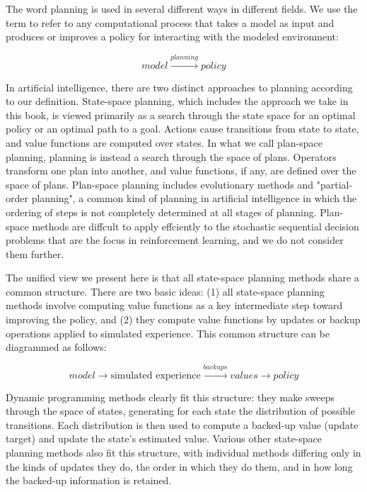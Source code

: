 \documentclass{article}
\begin{document}
The word planning is used in several different ways in different fields. We use the term to refer to any computational process that takes a model as input and produces or improves a policy 
for interacting with the modeled environment:

$$
model \xrightarrow{planning} policy
$$

In artificial intelligence, there are two distinct approaches to planning according to our definition. State-space planning, which includes the approach we take in this book, 
is viewed primarily as a search through the state space for an optimal policy or an optimal path to a goal. Actions cause transitions from state to state, and value functions are computed over states. 
In what we call plan-space planning, planning is instead a search through the space of plans. Operators transform one plan into another, and value functions, if any, are defined over the space of plans. 
Plan-space planning includes evolutionary methods and "partial-order planning", a common kind of planning in artificial intelligence in which the ordering of steps is not completely determined at all stages of planning. 
Plan-space methods are diffcult to apply effciently to the stochastic sequential decision problems that are the focus in reinforcement learning, and we do not consider them further.

The unified view we present here is that all state-space planning methods share a common structure.
There are two basic ideas: (1) all state-space planning methods involve computing value functions as a key intermediate step toward improving the policy, 
and (2) they compute value functions by updates or backup operations applied to simulated experience. This common structure can be diagrammed as follows:

$$
model \rightarrow \text{simulated experience} \xrightarrow{backups} values \rightarrow policy
$$

Dynamic programming methods clearly fit this structure: they make sweeps through the space of states, generating for each state the distribution of possible transitions. 
Each distribution is then used to compute a backed-up value (update target) and update the state's estimated value. Various other state-space 
planning methods also fit this structure, with individual methods differing only in the kinds of updates they do, the order in which they do them, and in how long the backed-up information is retained.
\end{document}
